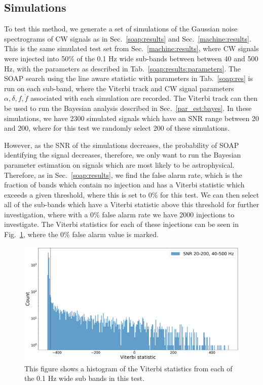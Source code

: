\subsection{Simulations}
%
%
To test this method, we generate a set of simulations of the Gaussian noise spectrograms of \gls{CW} signals as in Sec.~\ref{soap:results} and Sec.~\ref{machine:results}.
This is the same simulated test set from Sec.~\ref{machine:results}, where \gls{CW} signals were injected into 50\% of the 0.1 Hz wide sub-bands between between 40 and 500 Hz, with the parameters as described in Tab.~\ref{soap:results:parameters}. 
The SOAP search using the line aware statistic with parameters in Tab.~\ref{soap:res}  is run on each sub-band, where the Viterbi track and \gls{CW} signal parameters $\alpha, \delta, f, \dot{f}$ associated with each simulation are recorded.
The Viterbi track can then be used to run the Bayesian analysis described in Sec.~\ref{par_est:bayes}.
In these simulations, we have 2300 simulated signals which have an \gls{SNR} range between 20 and 200, where for this test we randomly select 200 of these simulations.

\if
However, as the \gls{SNR} of the simulations decreases, the probability of SOAP identifying the signal decreases, therefore, we only want to run the Bayesian parameter estimation on signals which are most likely to be astrophysical.
Therefore, as in Sec.~\ref{soap:results}, we find the false alarm rate, which is the fraction of bands which contain no injection and has a Viterbi statistic which exceeds a given threshold, where this is set to 0\% for this test.
We can then select all of the sub-bands which have a Viterbi statistic above this threshold for further investigation, where with a 0\% false alarm rate we have 2000  injections to investigate.
The Viterbi statistics for each of these injections can be seen in Fig.~\ref{par_est:results:all_viterbi}, where the 0\% false alarm value is marked.
%
\begin{figure}
    \centering
    \includegraphics[width=\linewidth]{C5_parameter/viterbi_hist.pdf}
    \caption[All Viterbi statistics]{This figure shows a histogram of the Viterbi statistics from each of the 0.1 Hz wide sub bands in this test. }
    \label{par_est:results:all_viterbi}
\end{figure}
\fi


